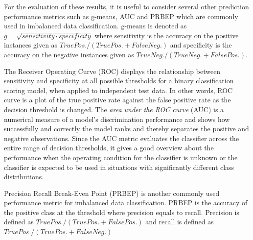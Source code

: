 For the evaluation of these results, it is useful to consider  several other prediction performance metrics such as g-means, AUC and PRBEP which are commonly used in imbalanced data classification. g-means \cite{Kubat_1997} is denoted as $g=\sqrt{sensitivity \cdot specificity}$ where sensitivity is the accuracy on the positive instances given as $True Pos./(True Pos.+False Neg.)$ and specificity is the accuracy on the negative instances given as $True Neg./(True Neg.+False Pos.)$.

The Receiver Operating Curve (ROC) displays the relationship between sensitivity and specificity at all possible thresholds for a binary classification scoring model, when applied to independent test data. In other words, ROC curve is a plot of the true positive rate against the false positive rate as the decision threshold is changed. The \textit{area under the ROC curve} (AUC) is a numerical measure of a model's discrimination performance and shows how successfully and correctly the model ranks and thereby separates the positive and negative observations. Since the AUC metric evaluates the classifier across the entire range of decision thresholds, it gives a good overview about the performance when the operating condition for the classifier is unknown or the classifier is expected to be used in situations with significantly different class distributions.

Precision Recall Break-Even Point (PRBEP) is another commonly used performance metric for imbalanced data classification. PRBEP is the accuracy of the positive class at the threshold where precision equals to recall. Precision is defined as $True Pos./(True Pos.+False Pos.)$ and recall is defined as $True Pos./(True Pos.+False Neg.)$


